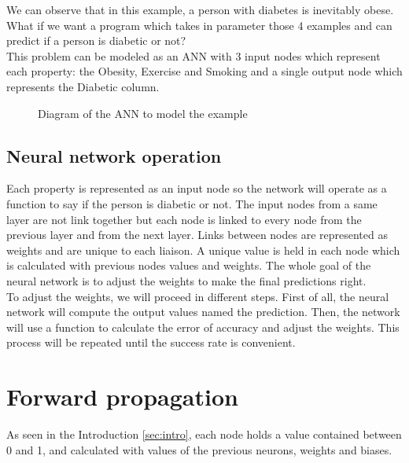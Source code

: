 \documentclass[]{report}
\begin{document}
{We can observe that in this example, a person with diabetes is inevitably obese. What if we want a program which takes in parameter those 4 examples and can predict if a person is diabetic or not?}\\

{This problem can be modeled as an ANN with 3 input nodes which represent each property: the Obesity, Exercise and Smoking and a single output node which represents
the Diabetic column.}

\begin{figure}[H]
    \centering
    \begin{neuralnetwork}[height=3, nodespacing=15mm]
        \outputlayer[count=1, title=Output layer]
        \linklayers
    \end{neuralnetwork}
    \caption{Diagram of the ANN to model the example}
\end{figure}

\subsection{Neural network operation}
\label{subsec:operation}

{Each property is represented as an input node so the network will operate as a function to say if the person is diabetic or not. The input nodes from a same layer are not link together but each node is linked to every node from the previous layer and from the next layer. Links between nodes are represented as weights and are unique to each liaison. A unique value is held in each node which is calculated with previous nodes values and weights. The whole goal of the neural network is to adjust the weights to make the final predictions
right.}\\

{To adjust the weights, we will proceed in different steps. First of all, the neural network will
compute the output values named the prediction. Then, the network will use a function to calculate the error of accuracy and adjust the weights. This process will be repeated until the success rate is convenient.}

\section{Forward propagation}

{As seen in the Introduction \ref{sec:intro}, each node holds a value contained between 0 and 1, and calculated with values of the previous neurons, weights and biases.}
\end{document}
